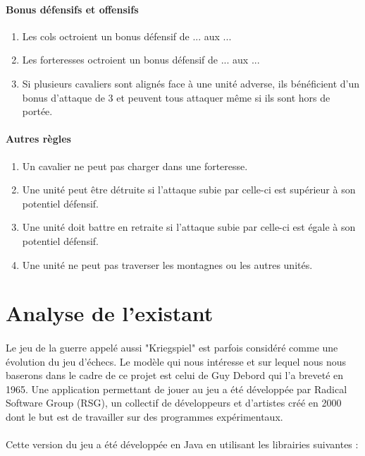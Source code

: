 \documentclass[12pt]{article}
\begin{document}
		\paragraph{Bonus défensifs et offensifs}
		\begin{enumerate}
		\item Les cols octroient un bonus défensif de ... aux ...
		\item Les forteresses octroient un bonus défensif de ... aux ...
		\item Si plusieurs cavaliers sont alignés face à une unité adverse, ils bénéficient d'un bonus d'attaque de 3 et peuvent tous attaquer même si ils sont hors de portée.
		\end{enumerate}
		
		\paragraph{Autres règles}
		\begin{enumerate}
		\item Un cavalier ne peut pas charger dans une forteresse.
		\item Une unité peut être détruite si l'attaque subie par celle-ci est supérieur à son potentiel défensif.
		\item Une unité doit battre en retraite si l'attaque subie par celle-ci est égale à son potentiel défensif.
		\item Une unité ne peut pas traverser les montagnes ou les autres unités.
		\end{enumerate}
		\clearpage

	\section{Analyse de l'existant}    

		\paragraph{}
		Le jeu de la guerre appelé aussi "Kriegspiel" est parfois considéré comme une évolution du jeu d'échecs.
		Le modèle qui nous intéresse et sur lequel nous nous baserons dans le cadre de ce projet est celui de Guy Debord qui l'a breveté en 1965.
		Une application permettant de jouer au jeu a été développée par Radical Software Group (RSG), un collectif de développeurs et d'artistes 
		créé en 2000 dont le but est de travailler sur des programmes expérimentaux.
		
		\paragraph{}
		Cette version du jeu a été développée en Java en utilisant les librairies suivantes :
		
\end{document}
